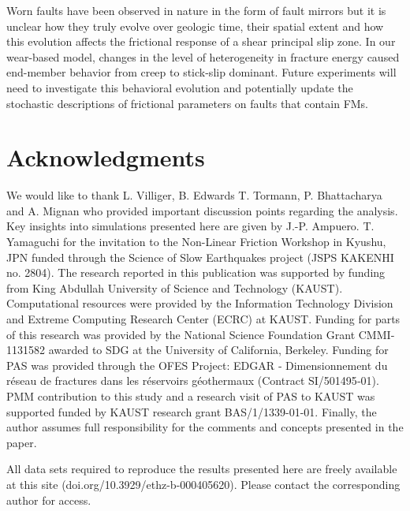 \documentclass[preprint,1p, 10pt,authoryear]{elsarticle}
\begin{document}
Worn faults have been observed in nature in the form of fault mirrors but it is unclear how they truly evolve over geologic time, their spatial extent and how this evolution affects the frictional response of a shear principal slip zone. In our wear-based model, changes in the level of heterogeneity in fracture energy caused end-member behavior from creep to stick-slip dominant. Future experiments will need to investigate this behavioral evolution and potentially update the stochastic descriptions of frictional parameters on faults that contain FMs. 

\section*{Acknowledgments}
We would like to thank L. Villiger, B. Edwards T. Tormann, P. Bhattacharya and A. Mignan who provided important discussion points regarding the analysis. Key insights into simulations presented here are given by J.-P. Ampuero. T. Yamaguchi for the invitation to the Non-Linear Friction Workshop in Kyushu, JPN funded through the Science of Slow Earthquakes project (JSPS KAKENHI no. 2804). The research reported in this publication was supported by funding from King Abdullah University of Science and Technology (KAUST). Computational resources were provided by the Information Technology Division and Extreme Computing Research Center (ECRC) at KAUST. Funding for parts of this research was provided by the National Science Foundation Grant CMMI‐1131582 awarded to SDG at the University of California, Berkeley. Funding for PAS was provided through the OFES Project: EDGAR ‐ Dimensionnement du réseau de fractures dans les réservoirs géothermaux (Contract SI/501495‐01). PMM contribution to this study and a research visit of PAS to KAUST was supported funded by KAUST research grant BAS/1/1339-01-01. Finally, the author assumes full responsibility for the comments and concepts presented in the paper.

All data sets required to reproduce the results presented here are freely available at this site (doi.org/10.3929/ethz-b-000405620). Please contact the corresponding author for access.

\singlespacing

 

\end{document}
